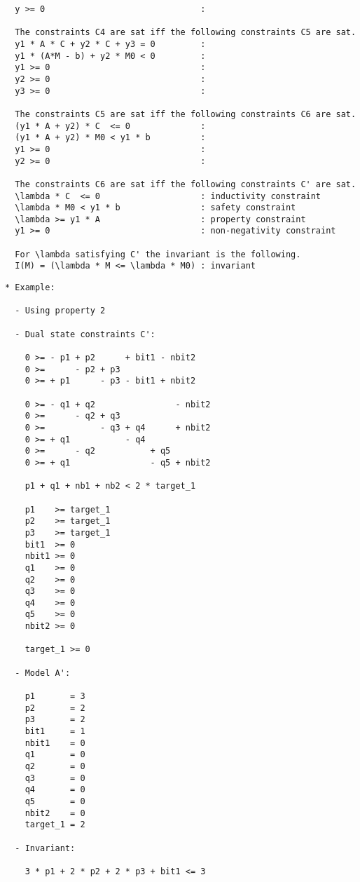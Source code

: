 \documentclass{llncs}
\begin{document}
\begin{verbatim}
  y >= 0                               : 

  The constraints C4 are sat iff the following constraints C5 are sat.
  y1 * A * C + y2 * C + y3 = 0         : 
  y1 * (A*M - b) + y2 * M0 < 0         : 
  y1 >= 0                              : 
  y2 >= 0                              : 
  y3 >= 0                              : 

  The constraints C5 are sat iff the following constraints C6 are sat.
  (y1 * A + y2) * C  <= 0              : 
  (y1 * A + y2) * M0 < y1 * b          : 
  y1 >= 0                              : 
  y2 >= 0                              : 

  The constraints C6 are sat iff the following constraints C' are sat.
  \lambda * C  <= 0                    : inductivity constraint
  \lambda * M0 < y1 * b                : safety constraint
  \lambda >= y1 * A                    : property constraint
  y1 >= 0                              : non-negativity constraint

  For \lambda satisfying C' the invariant is the following.
  I(M) = (\lambda * M <= \lambda * M0) : invariant
\end{verbatim}

\newpage

\begin{verbatim}
* Example:
  
  - Using property 2

  - Dual state constraints C':

    0 >= - p1 + p2      + bit1 - nbit2
    0 >=      - p2 + p3
    0 >= + p1      - p3 - bit1 + nbit2

    0 >= - q1 + q2                - nbit2
    0 >=      - q2 + q3
    0 >=           - q3 + q4      + nbit2
    0 >= + q1           - q4
    0 >=      - q2           + q5
    0 >= + q1                - q5 + nbit2

    p1 + q1 + nb1 + nb2 < 2 * target_1

    p1    >= target_1
    p2    >= target_1
    p3    >= target_1
    bit1  >= 0
    nbit1 >= 0
    q1    >= 0
    q2    >= 0
    q3    >= 0
    q4    >= 0
    q5    >= 0
    nbit2 >= 0

    target_1 >= 0

  - Model A':

    p1       = 3
    p2       = 2
    p3       = 2
    bit1     = 1
    nbit1    = 0
    q1       = 0
    q2       = 0
    q3       = 0
    q4       = 0
    q5       = 0
    nbit2    = 0
    target_1 = 2
    
  - Invariant:

    3 * p1 + 2 * p2 + 2 * p3 + bit1 <= 3

\end{verbatim}
\end{document}
